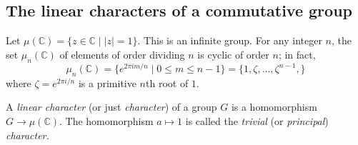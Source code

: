 \documentclass[a4paper,11pt,final]{memoir}%
\theoremstyle{nonumberplain}
\begin{document}

\subsection{The linear characters of a commutative group}

Let $\mu(\mathbb{C}{})=\{z\in\mathbb{C}{}\mid|z|=1\}$. This is an infinite
group. For any integer $n$, the set $\mu_{n}(\mathbb{C}{})$ of elements of
order dividing $n$ is cyclic of order $n$; in fact,%
\[
\mu_{n}(\mathbb{C}{})=\{e^{2\pi im/n}\mid0\leq m\leq n-1\}=\{1,\zeta
,\ldots,\zeta^{n-1},\}
\]
where $\zeta=e^{2\pi i/n}$ is a primitive $n$th root of $1$.

A \emph{linear character} (or just \emph{character}) of a group $G$ is a
homomorphism $G\rightarrow\mu(\mathbb{C}{})$. The homomorphism $a\mapsto1$ is
called the \emph{trivial} (or \emph{principal}) \emph{character.}
\end{document}
